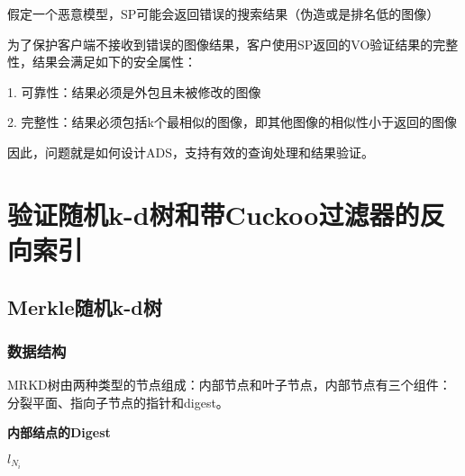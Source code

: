 \documentclass{article}
\begin{document}
假定一个恶意模型，SP可能会返回错误的搜索结果（伪造或是排名低的图像）

为了保护客户端不接收到错误的图像结果，客户使用SP返回的VO验证结果的完整性，结果会满足如下的安全属性：

1. 可靠性：结果必须是外包且未被修改的图像

2. 完整性：结果必须包括k个最相似的图像，即其他图像的相似性小于返回的图像


因此，问题就是如何设计ADS，支持有效的查询处理和结果验证。

\section{验证随机k-d树和带Cuckoo过滤器的反向索引}

\subsection{Merkle随机k-d树}

\subsubsection{数据结构}

MRKD树由两种类型的节点组成：内部节点和叶子节点，内部节点有三个组件：分裂平面、指向子节点的指针和digest。

\textbf{内部结点的Digest}

$l_{N_i}$ 
\end{document}

